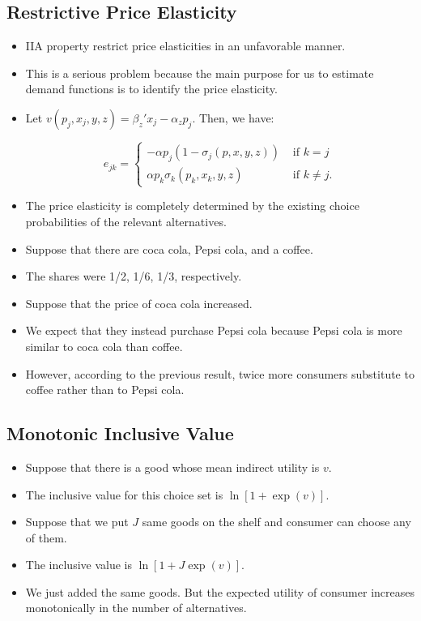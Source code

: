 \documentclass[]{book}
\providecommand{\tightlist}{%
  \setlength{\itemsep}{0pt}\setlength{\parskip}{0pt}}
\begin{document}
\subsection{Restrictive Price
Elasticity}\label{restrictive-price-elasticity}

\begin{itemize}
\tightlist
\item
  IIA property restrict price elasticities in an unfavorable manner.
\item
  This is a serious problem because the main purpose for us to estimate
  demand functions is to identify the price elasticity.
\item
  Let \(v(p_j, x_j, y, z) = \beta_z'x_j - \alpha_z p_j\). Then, we have:

  \begin{equation}
  e_{jk} =
  \begin{cases}
  -\alpha p_{j} (1 - \sigma_j(p, x, y, z)) &\text{   if   } k = j\\
  \alpha p_{k} \sigma_k(p_k, x_k, y, z) &\text{   if   } k \neq j.
  \end{cases}
  \end{equation}
\item
  The price elasticity is completely determined by the existing choice
  probabilities of the relevant alternatives.
\item
  Suppose that there are coca cola, Pepsi cola, and a coffee.
\item
  The shares were 1/2, 1/6, 1/3, respectively.
\item
  Suppose that the price of coca cola increased.
\item
  We expect that they instead purchase Pepsi cola because Pepsi cola is
  more similar to coca cola than coffee.
\item
  However, according to the previous result, twice more consumers
  substitute to coffee rather than to Pepsi cola.
\end{itemize}

\subsection{Monotonic Inclusive Value}\label{monotonic-inclusive-value}

\begin{itemize}
\tightlist
\item
  Suppose that there is a good whose mean indirect utility is \(v\).
\item
  The inclusive value for this choice set is \(\ln[1 + \exp(v)]\).
\item
  Suppose that we put \(J\) same goods on the shelf and consumer can
  choose any of them.
\item
  The inclusive value is \(\ln[1 + J \exp(v)]\).
\item
  We just added the same goods. But the expected utility of consumer
  increases monotonically in the number of alternatives.
\end{itemize}
\end{document}
